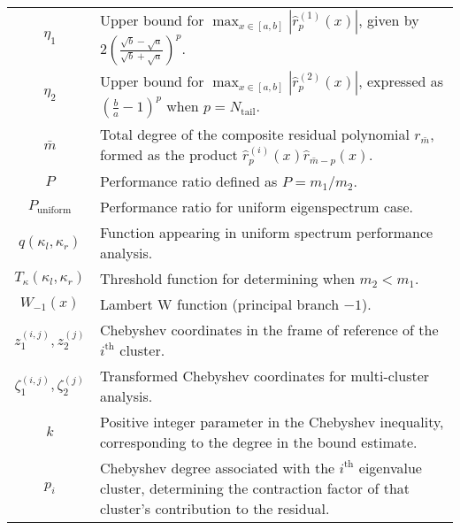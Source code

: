 \begin{longtable}{c p{10cm}}
    $\eta_1$                         & Upper bound for $\max_{x \in [a,b]} |\hat{r}^{(1)}_p(x)|$, given by $2\left(\frac{\sqrt{b}-\sqrt{a}}{\sqrt{b}+\sqrt{a}}\right)^p$.                        \\
    $\eta_2$                         & Upper bound for $\max_{x \in [a,b]} |\hat{r}^{(2)}_p(x)|$, expressed as $\left(\frac{b}{a}-1\right)^p$ when $p=N_{\text{tail}}$.                          \\
    $\bar{m}$                        & Total degree of the composite residual polynomial $r_{\bar{m}}$, formed as the product $\hat{r}^{(i)}_p(x)\hat{r}_{\bar{m}-p}(x)$.                        \\
    $P$                              & Performance ratio defined as $P = m_1/m_2$.                                                                                                               \\
    $P_{\text{uniform}}$             & Performance ratio for uniform eigenspectrum case.                                                                                                         \\
    $q(\kappa_l, \kappa_r)$          & Function appearing in uniform spectrum performance analysis.                                                                                              \\
    $T_{\kappa}(\kappa_l, \kappa_r)$ & Threshold function for determining when $m_2 < m_1$.                                                                                                      \\
    $W_{-1}(x)$                      & Lambert W function (principal branch $-1$).                                                                                                               \\
    $z^{(i,j)}_1, z^{(j)}_2$         & Chebyshev coordinates in the frame of reference of the $i^{\text{th}}$ cluster.                                                                           \\
    $\zeta^{(i,j)}_1, \zeta^{(j)}_2$ & Transformed Chebyshev coordinates for multi-cluster analysis.                                                                                             \\
    $k$                              & Positive integer parameter in the Chebyshev inequality, corresponding to the degree in the bound estimate.                                                \\
    $p_i$                            & Chebyshev degree associated with the $i^\text{th}$ eigenvalue cluster, determining the contraction factor of that cluster's contribution to the residual. \\

\end{longtable}

